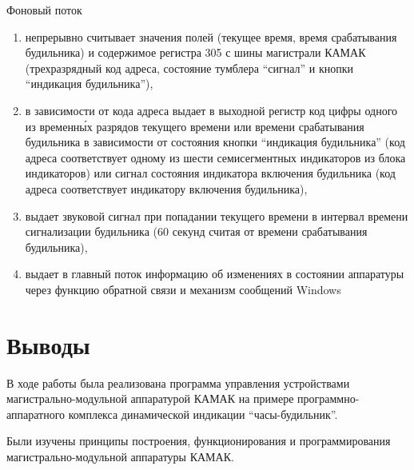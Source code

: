 Фоновый поток

\begin{enumerate}[label=\asbuk*)]

\item непрерывно считывает значения полей (текущее время, время срабатывания будильника) и содержимое регистра 305 с шины магистрали КАМАК (трехразрядный код адреса, состояние тумблера \enquote{сигнал} и кнопки \enquote{индикация будильника}),

\item в зависимости от кода адреса выдает в выходной регистр код цифры одного из временн\'{ы}х разрядов текущего времени или времени срабатывания будильника в зависимости от состояния кнопки \enquote{индикация будильника} (код адреса соответствует одному из шести семисегментных индикаторов из блока индикаторов) или сигнал состояния индикатора включения будильника (код адреса соответствует индикатору включения будильника),

\item выдает звуковой сигнал при попадании текущего времени в интервал времени сигнализации будильника (60 секунд считая от времени срабатывания будильника),

\item выдает в главный поток информацию об изменениях в состоянии аппаратуры через функцию обратной связи и механизм сообщений Windows

\end{enumerate}

\section{Выводы}

В ходе работы была реализована программа управления устройствами магистрально-модульной аппаратурой КАМАК на примере программно-аппаратного комплекса динамической индикации \enquote{часы-будильник}.

Были изучены принципы построения, функционирования и программирования магистрально-модульной аппаратуры КАМАК.